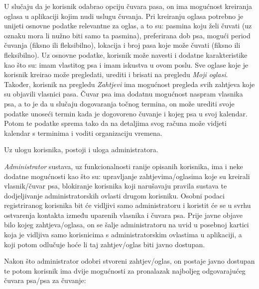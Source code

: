		U slučaju da je korisnik odabrao opciju čuvara pasa, on ima mogućnost kreiranja oglasa u aplikaciji kojim nudi uslugu čuvanja. Pri kreiranju oglasa potrebno je unijeti osnovne podatke relevantne za oglas, a to su: pasmina koju želi čuvati (uz oznaku mora li nužno biti samo ta pasmina), preferirana dob psa, mogući period čuvanja (fiksno ili fleksibilno), lokacija i broj pasa koje može čuvati (fiksno ili fleksibilno). Uz osnovne podatke, korisnik može navesti i dodatne karakteristike kao što su: imam vlastitog psa i imam iskustva u ovom poslu. Sve oglase koje je korisnik kreirao može pregledati, urediti i brisati na pregledu \textit{Moji oglasi}. Također, korisnik na pregledu \textit{Zahtjevi} ima mogućnost pregleda svih zahtjeva koje su objavili vlasnici pasa. Čuvar psa ima dodatnu mogućnost naspram vlasnika psa, a to je da u slučaju dogovaranja točnog termina, on može urediti svoje podatke unoseći termin kada je dogovoreno čuvanje i kojeg psa u svoj kalendar. Potom te podatke sprema tako da na detaljima svog računa može vidjeti kalendar s terminima i voditi organizaciju vremena.
		
		Uz ulogu korisnika, postoji i uloga administratora.
		
		\textit{Administrator} sustava, uz funkcionalnosti ranije opisanih korisnika, ima i neke dodatne mogućnosti kao što su: upravljanje zahtjevima/oglasima koje su kreirali vlasnik/čuvar psa, blokiranje korisnika koji narušavaju pravila sustava te dodjeljivanje administratorskih ovlasti drugom korisniku. Osobni podaci registriranog korisnika bit će vidljivi samo administratoru i koristit će se u svrhu ostvarenja kontakta između uparenih vlasnika i čuvara psa. Prije javne objave bilo kojeg zahtjeva/oglasa, on se šalje administratoru na uvid u posebnoj kartici koja je vidljiva samo korisnicima s administratorskim ovlastima u aplikaciji, a koji potom odlučuje hoće li taj zahtjev/oglas biti javno dostupan.
		
		Nakon što administrator odobri stvoreni zahtjev/oglas, on postaje javno dostupan te potom korisnik ima dvije mogućnosti za pronalazak najboljeg odgovarajućeg čuvara psa/psa za čuvanje:
		
